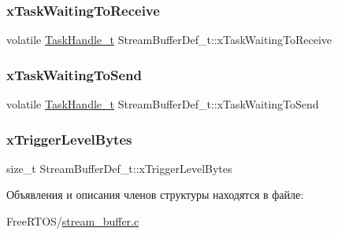 \mbox{\label{struct_stream_buffer_def__t_a8377ae8625121efa22d66e678add4057}} 
\subsubsection{\texorpdfstring{xTaskWaitingToReceive}{xTaskWaitingToReceive}}
{\footnotesize\ttfamily volatile \mbox{\hyperlink{task_8h_a25b35e6e19ecf894173e7ff95edb96ef}{Task\+Handle\+\_\+t}} Stream\+Buffer\+Def\+\_\+t\+::x\+Task\+Waiting\+To\+Receive}

\mbox{\label{struct_stream_buffer_def__t_a85b1cf05c0222f8d67a64f7d01722e52}} 
\subsubsection{\texorpdfstring{xTaskWaitingToSend}{xTaskWaitingToSend}}
{\footnotesize\ttfamily volatile \mbox{\hyperlink{task_8h_a25b35e6e19ecf894173e7ff95edb96ef}{Task\+Handle\+\_\+t}} Stream\+Buffer\+Def\+\_\+t\+::x\+Task\+Waiting\+To\+Send}

\mbox{\label{struct_stream_buffer_def__t_a4a7ee9b374cc0b358d049811def8d595}} 
\subsubsection{\texorpdfstring{xTriggerLevelBytes}{xTriggerLevelBytes}}
{\footnotesize\ttfamily size\+\_\+t Stream\+Buffer\+Def\+\_\+t\+::x\+Trigger\+Level\+Bytes}



Объявления и описания членов структуры находятся в файле\+:\begin{DoxyCompactItemize}
\item 
Free\+R\+T\+O\+S/\mbox{\hyperlink{stream__buffer_8c}{stream\+\_\+buffer.\+c}}\end{DoxyCompactItemize}
